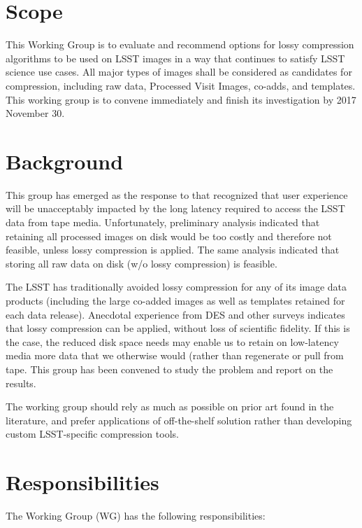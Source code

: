 
\section{Scope}

This Working Group is to evaluate and recommend options for lossy compression 
algorithms to be used on LSST images in a way that continues to satisfy LSST 
science use cases. All major types of images shall be considered as candidates 
for compression, including raw data, Processed Visit Images, co-adds, and 
templates.  This working group is to convene immediately and finish its 
investigation by 2017 November 30.

\section{Background}

This group has emerged as the response to  that recognized that user 
experience will be unacceptably impacted by the long latency required to 
access the LSST data from tape media. Unfortunately, preliminary analysis
indicated that retaining all processed images on disk would be too costly 
and therefore not feasible, unless lossy compression is applied. The same
analysis indicated that storing all raw data on disk (w/o lossy compression)
is feasible.

The LSST has traditionally avoided lossy compression for any of its image 
data products (including the large co-added images as well as templates 
retained for each data release). Anecdotal experience from DES and other 
surveys indicates that lossy compression can be applied, without loss of 
scientific fidelity. If this is the case, the reduced disk space needs may 
enable us to retain on low-latency media more data that we otherwise would 
(rather than regenerate or pull from tape. This group has been convened to 
study the problem and report on the results.

The working group should rely as much as possible on prior art found in the
literature, and prefer applications of off-the-shelf solution rather than 
developing custom LSST-specific compression tools.

\section{Responsibilities}

The Working Group (WG) has the following responsibilities:

